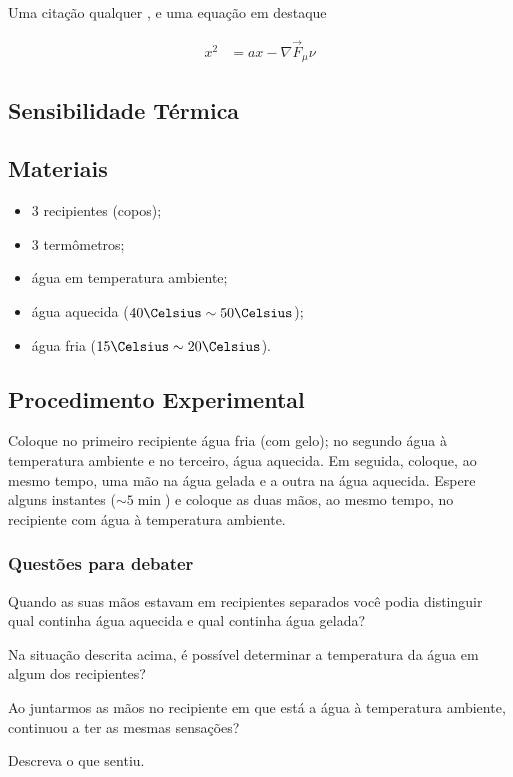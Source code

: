 \documentclass[
	12pt,				%
	openright,			%
	oneside,			%
	a4paper,			%
	chapter=TITLE,		%
	english,			%
	brazil				%
]{abntex2}
\begin{document}
	\noindent Uma citação qualquer \cite{LAMBERTS:2011}, e uma equação em destaque 

    
	\begin{align}
		x^2&=ax-\nabla\vec{F}_\mu\nu
	\end{align}
	
    \begin{anexosenv}		    
        \chapter{Sensibilidade Térmica}
        \section{Materiais}
        \begin{itemize}
            \item 3 recipientes (copos);
            \item 3 termômetros;
            \item água em temperatura ambiente;
            \item água aquecida ($40\Celsius\sim50\Celsius$);
            \item água fria ($15\Celsius\sim20\Celsius$).
        \end{itemize}
        \section{Procedimento Experimental}
        Coloque no primeiro recipiente água fria (com gelo); no segundo água à temperatura ambiente e no terceiro, água aquecida. Em seguida, coloque, ao mesmo tempo, uma mão na água gelada e a outra na água aquecida. Espere alguns instantes ($\sim5\min$) e coloque as duas mãos, ao mesmo tempo, no recipiente com água à temperatura ambiente.

        \subsection{Questões para debater}
        \begin{quest}
            Quando as suas mãos estavam em recipientes separados você podia distinguir qual continha água aquecida e qual continha água gelada?
        \end{quest}
        \begin{quest}
            Na situação descrita acima, é possível determinar a temperatura da água em algum dos recipientes?
        \end{quest}
        \begin{quest}
            Ao juntarmos as mãos no recipiente em que está a água à temperatura ambiente, continuou a ter as mesmas sensações?
        \end{quest}
        \begin{quest}
            Descreva o que sentiu.
        \end{quest}
    \end{anexosenv}
\end{document}
